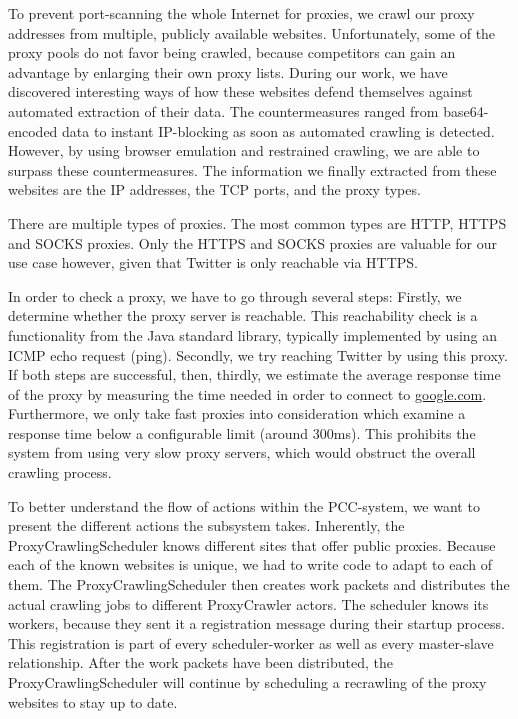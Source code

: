 \documentclass{sigchi}
\begin{document}
To prevent port-scanning the whole Internet for proxies, we crawl our proxy addresses from multiple, publicly available websites. Unfortunately, some of the proxy pools do not favor being crawled, because competitors can gain an advantage by enlarging their own proxy lists.  During our work, we have discovered interesting ways of how these websites defend themselves against automated extraction of their data. The countermeasures ranged from base64-encoded data to instant IP-blocking as soon as automated crawling is detected. However, by using browser emulation and restrained crawling, we are able to surpass these countermeasures. The information we finally extracted from these websites are the IP addresses, the TCP ports, and the proxy types.

There are multiple types of proxies. The most common types are HTTP, HTTPS and SOCKS proxies. Only the HTTPS and SOCKS proxies are valuable for our use case however, given that Twitter is only reachable via HTTPS.

In order to check a proxy, we have to go through several steps:
Firstly, we determine whether the proxy server is reachable. This reachability check is a functionality from the Java standard library, typically implemented by using an ICMP echo request (ping). 
Secondly, we try reaching Twitter by using this proxy. If both steps are successful, then, thirdly, we estimate the average response time of the proxy by measuring the time needed in order to connect to \url{google.com}. Furthermore, we only take fast proxies into consideration which examine a response time below a configurable limit (around 300ms). This prohibits the system from using very slow proxy servers, which would obstruct the overall crawling process.

To better understand the flow of actions within the PCC-system, we want to present the different actions the subsystem takes. Inherently, the ProxyCrawlingScheduler knows different sites that offer public proxies. Because each of the known websites is unique, we had to write code to adapt to each of them. The ProxyCrawlingScheduler then creates work packets and distributes the actual crawling jobs to different ProxyCrawler actors. The scheduler knows its workers, because they sent it a registration message during their startup process. This registration is part of every scheduler-worker as well as every master-slave relationship. After the work packets have been distributed, the ProxyCrawlingScheduler will continue by scheduling a recrawling of the proxy websites to stay up to date. 
\end{document}
